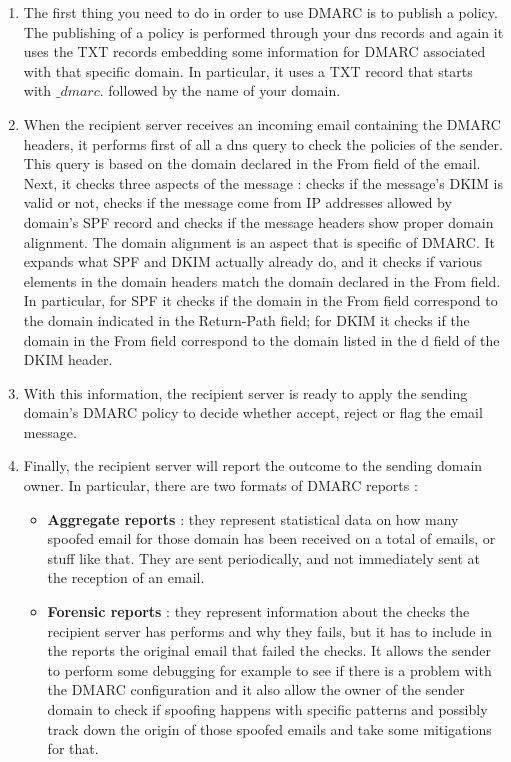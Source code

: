 \begin{enumerate}
\item The first thing you need to do in order to use DMARC is to publish a policy. The publishing of a policy is performed through your dns records and again it uses the TXT records embedding some information for DMARC associated with that specific domain. In particular, it uses a TXT record that starts with $\_dmarc.$ followed by the name of your domain.
\item When the recipient server receives an incoming email containing the DMARC headers, it performs first of all a dns query to check the policies of the sender. This query is based on the domain declared in the From field of the email. Next, it checks three aspects of the message : checks if the message's DKIM is valid or not, checks if the message come from IP addresses allowed by domain's SPF record and checks if the message headers show proper domain alignment. The domain alignment is an aspect that is specific of DMARC. It expands what SPF and DKIM actually already do, and it checks if various elements in the domain headers match the domain declared in the From field. In particular, for SPF it checks if the domain in the From field correspond to the domain indicated in the Return-Path field; for DKIM it checks if the domain in the From field correspond to the domain listed in the d field of the DKIM header.
\item With this information, the recipient server is ready to apply the sending domain's DMARC policy to decide whether accept, reject or flag the email message.
\item Finally, the recipient server will report the outcome to the sending domain owner. In particular, there are two formats of DMARC reports :
\begin{itemize}
\item \textbf{Aggregate reports} : they represent statistical data on how many spoofed email for those domain has been received on a total of emails, or stuff like that. They are sent periodically, and not immediately sent at the reception of an email.
\item \textbf{Forensic reports} : they represent information about the checks the recipient server has performs and why they fails, but it has to include in the reports the original email that failed the checks. It allows the sender to perform some debugging for example to see if there is a problem with the DMARC configuration  and it also allow the owner of the sender domain to check if spoofing happens with specific patterns and possibly track down the origin of those spoofed emails and take some mitigations for that.
\end{itemize}
\end{enumerate}
